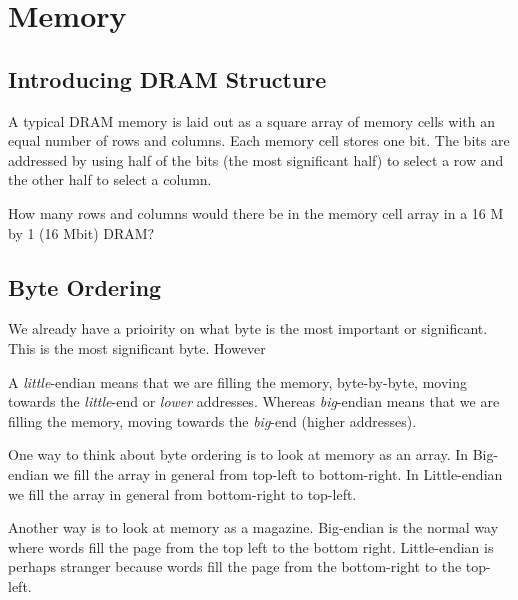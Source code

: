

\chapter{Memory}


\section{Introducing DRAM Structure}


A typical DRAM memory is laid out as a square
array of memory cells with an equal number of rows
and columns. Each memory cell stores one bit. The
bits are addressed by using half of the bits (the most
signiﬁcant half) to select a row and the other half to
select a column.

\begin{example}

How many rows and columns would there be
in the memory cell array in a 16 M by 1 (16 Mbit) DRAM?

\end{example} 


\section{Byte Ordering}

We already have a prioirity on what byte is the most important 
or significant. This is the most significant byte. However 


A \textit{little}-endian means that we are filling the memory, 
byte-by-byte, moving towards the \textit{little}-end or \textit{lower} addresses.
Whereas \textit{big}-endian means that we are filling the memory, 
moving towards the \textit{big}-end (higher addresses).



\begin{example}
One way to think about byte ordering is to look at memory as an array. 
In Big-endian we fill the array in general from top-left to bottom-right. 
In Little-endian we fill the array in general from bottom-right to top-left. 
\end{example}

\begin{example}
Another way is to look at memory as a magazine. 
Big-endian is the normal way where words fill the page 
from the top left to the bottom right. Little-endian is 
perhaps stranger because words fill the page from the 
bottom-right to the top-left.
\end{example}

